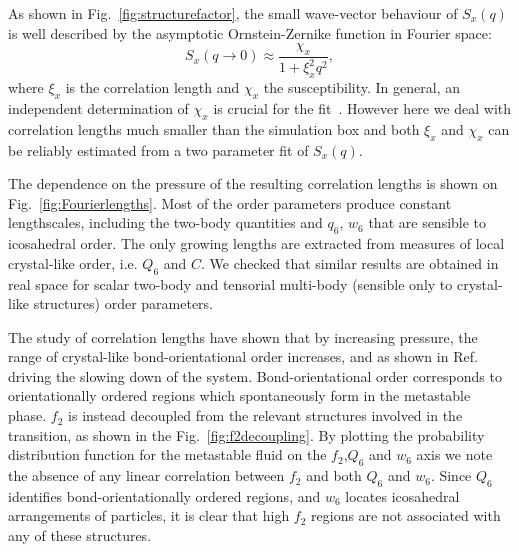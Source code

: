 \documentclass[twocolumn,superscriptaddress]{revtex4-1}
\begin{document}
As shown in Fig.~\ref{fig:structurefactor}, the small wave-vector behaviour of $S_x(q)$ is well described by the asymptotic Ornstein-Zernike function in Fourier space:
\begin{equation}
	S_x(q\rightarrow 0) \approx \frac{\chi_x}{1+\xi_x^2 q^2},
	\label{eq:OZ_Fourier}
\end{equation}
where $\xi_x$ is the correlation length and $\chi_x$ the susceptibility. In general, an independent determination of $\chi_x$ is crucial for the fit~\cite{Flenner2011}. However here we deal with correlation lengths much smaller than the simulation box and both $\xi_x$ and $\chi_x$ can be reliably estimated from a two parameter fit of $S_x(q)$.

The dependence on the pressure of the resulting correlation lengths is shown on Fig.~\ref{fig:Fourierlengths}. Most of the order parameters produce constant lengthscales, including the two-body quantities and $q_6$, $w_6$ that are sensible to icosahedral order. The only growing lengths are extracted from measures of local crystal-like order, i.e. $Q_6$ and $C$. We checked that similar results are obtained in real space for scalar two-body and tensorial multi-body (sensible only to crystal-like structures) order parameters.

The study of correlation lengths have shown that by increasing pressure, the range of
crystal-like bond-orientational order increases, and as shown in Ref.~\cite{tanaka,mathieu_icosahedra}
driving the slowing down of the system. Bond-orientational order corresponds to
orientationally ordered regions which spontaneously form in the metastable phase.
$f_2$ is instead decoupled from the relevant structures involved in the transition, as
shown in the Fig.~\ref{fig:f2decoupling}. By plotting the probability distribution
function for the metastable fluid on the $f_2$,$Q_6$ and $w_6$ axis we note the
absence of any linear correlation between $f_2$ and both $Q_6$ and $w_6$. Since
$Q_6$ identifies bond-orientationally ordered regions, and $w_6$ locates icosahedral
arrangements of particles, it is clear that high $f_2$ regions are not associated
with any of these structures.
\end{document}
